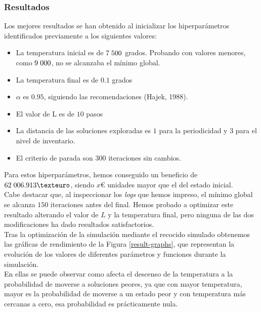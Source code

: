 \documentclass[a4paper,12pt]{article}
\begin{document}
	\subsubsection{Resultados}
	Los mejores resultados se han obtenido al inicializar los hiperparámetros identificados previamente a los siguientes valores:
	\begin{itemize}
		\item La temperatura inicial es de $7\hspace{1mm}500$ grados. Probando con valores menores, como $9\hspace{1mm}000$, no se alcanzaba el mínimo global.
		\item La temperatura final es de $0.1$ grados
		\item $\alpha$ es $0.95$, siguiendo las recomendaciones (Hajek, 1988).
		\item El valor de L es de $10$ pasos
		\item La distancia de las soluciones exploradas es $1$ para la periodicidad y $3$ para el nivel de inventario.
		\item El criterio de parada son $300$ iteraciones sin cambios.
	\end{itemize}
	Para estos hiperparámetros, hemos conseguido un beneficio de $62\hspace{1mm}006.913€$, siendo $x€$ unidades mayor que el del estado inicial. \\
	
	Cabe destacar que, al inspeccionar los \textit{logs} que hemos impreso, el mínimo global se alcanza $150$ iteraciones antes del final. Hemos probado a optimizar este resultado alterando el valor de $L$ y la temperatura final, pero ninguna de las dos modificaciones ha dado resultados satisfactorios. \\
	
	
	
	
	Tras la optimización de la simulación mediante el recocido simulado obtenemos las gráficas de rendimiento de la Figura \ref{result-graphs}, que representan la evolución de los valores de diferentes parámetros y funciones durante la simulación.\\
		
	En ellas se puede observar como afecta el descenso de la temperatura a la probabilidad de moverse a soluciones peores, ya que con mayor temperatura, mayor es la probabilidad de moverse a un estado peor y con temperatura más cercanas a cero, esa probabilidad es prácticamente nula.\\
	
\end{document}
